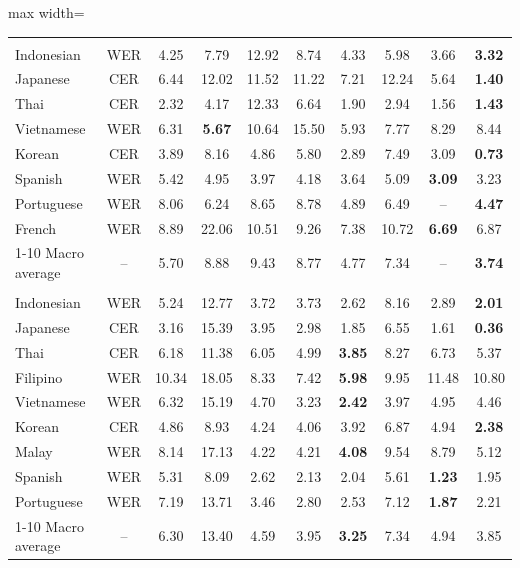 \documentclass{article}
\begin{document}
\begin{table}[t]
\begin{adjustbox}{max width=\textwidth}
\begin{tabular}{lccccccccc}
\rowcolor{QwenPurpleLight}
\multicolumn{10}{c}{\color{QwenPurple}\bfseries Common Voice 15} \\
Indonesian & WER & 4.25 & 7.79 & 12.92 & 8.74 & 4.33 & 5.98 & 3.66 & \textbf{3.32} \\
Japanese & CER & 6.44 & 12.02 & 11.52 & 11.22 & 7.21 & 12.24 & 5.64 & \textbf{1.40} \\
Thai & CER & 2.32 & 4.17 & 12.33 & 6.64 & 1.90 & 2.94 & 1.56 & \textbf{1.43} \\
Vietnamese & WER & 6.31 & \textbf{5.67} & 10.64 & 15.50 & 5.93 & 7.77 & 8.29 & 8.44 \\
Korean & CER & 3.89 & 8.16 & 4.86 & 5.80 & 2.89 & 7.49 & 3.09 & \textbf{0.73} \\
Spanish & WER & 5.42 & 4.95 & 3.97 & 4.18 & 3.64 & 5.09 & \textbf{3.09} & 3.23 \\
Portuguese & WER & 8.06 & 6.24 & 8.65 & 8.78 & 4.89 & 6.49 & -- & \textbf{4.47} \\
French & WER & 8.89 & 22.06 & 10.51 & 9.26 & 7.38 & 10.72 & \textbf{6.69} & 6.87 \\
\cmidrule(lr){1-10}
Macro average & -- & 5.70 & 8.88 & 9.43 & 8.77 & 4.77 & 7.34 & -- & \textbf{3.74} \\
\midrule

\rowcolor{QwenPurpleLight}
\multicolumn{10}{c}{\color{QwenPurple}\bfseries FLEURS} \\
Indonesian & WER & 5.24 & 12.77 & 3.72 & 3.73 & 2.62 & 8.16 & 2.89 & \textbf{2.01} \\
Japanese & CER & 3.16 & 15.39 & 3.95 & 2.98 & 1.85 & 6.55 & 1.61 & \textbf{0.36} \\
Thai & CER & 6.18 & 11.38 & 6.05 & 4.99 & \textbf{3.85} & 8.27 & 6.73 & 5.37 \\
Filipino & WER & 10.34 & 18.05 & 8.33 & 7.42 & \textbf{5.98} & 9.95 & 11.48 & 10.80 \\
Vietnamese & WER & 6.32 & 15.19 & 4.70 & 3.23 & \textbf{2.42} & 3.97 & 4.95 & 4.46 \\
Korean & CER & 4.86 & 8.93 & 4.24 & 4.06 & 3.92 & 6.87 & 4.94 & \textbf{2.38} \\
Malay & WER & 8.14 & 17.13 & 4.22 & 4.21 & \textbf{4.08} & 9.54 & 8.79 & 5.12 \\
Spanish & WER & 5.31 & 8.09 & 2.62 & 2.13 & 2.04 & 5.61 & \textbf{1.23} & 1.95 \\
Portuguese & WER & 7.19 & 13.71 & 3.46 & 2.80 & 2.53 & 7.12 & \textbf{1.87} & 2.21 \\
\cmidrule(lr){1-10}
Macro average & -- & 6.30 & 13.40 & 4.59 & 3.95 & \textbf{3.25} & 7.34 & 4.94 & 3.85 \\
\bottomrule
\end{tabular}
\end{adjustbox}
\endgroup
\vspace{3pt}
\end{table}
\end{document}
